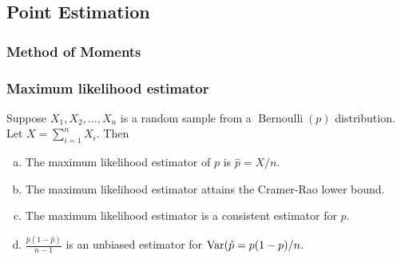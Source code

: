 \subsection{Point Estimation}

\subsubsection{Method of Moments}

\subsubsection{Maximum likelihood estimator}

\begin{proposition} Suppose \(X_1, X_2, \ldots, X_n\) is a random sample from a \(\operatorname{Bernoulli}(p)\) distribution. Let \(X =\sum_{i=1}^n X_i\). Then

\begin{enumerate}[(a)]

\item The maximum likelihood estimator of \(p\) is \( \hat{p} = X/n\).

\item The maximum likelihood estimator attains the Cramer-Rao lower bound.

\item The maximum likelihood estimator is a consistent estimator for \(p\).

\item \( \frac{\hat{p}(1-\hat{p})}{n-1}\) is an unbiased estimator for \(\Var(\hat{p} = p(1-p)/n\). 

\end{enumerate}

\end{proposition}

